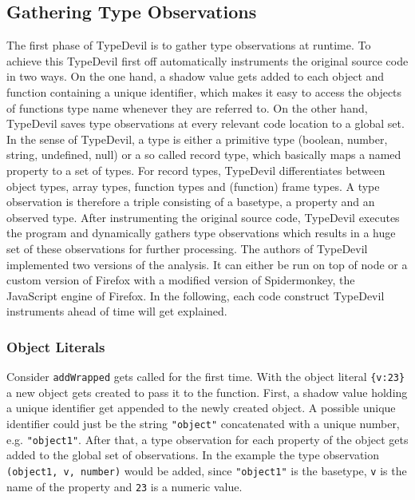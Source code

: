 \documentclass[runningheads,a4paper]{llncs}
\begin{document}
\subsection{Gathering Type Observations}

The first phase of TypeDevil is to gather type observations at runtime.
To achieve this TypeDevil first off automatically instruments the original source code in two ways.
On the one hand, a shadow value gets added to each object and function containing a unique identifier, which makes it easy to access the objects of functions type name whenever they are referred to. 
On the other hand, TypeDevil saves type observations at every relevant code location to a global set.
In the sense of TypeDevil, a type is either a primitive type (boolean, number, string, undefined, null) or a so called record type, which basically maps a named property to a set of types.
For record types, TypeDevil differentiates between object types, array types, function types and (function) frame types.
A type observation is therefore a triple consisting of a basetype, a property and an observed type.
After instrumenting the original source code, TypeDevil executes the program and dynamically gathers type observations which results in a huge set of these observations for further processing.
The authors of TypeDevil implemented two versions of the analysis. 
It can either be run on top of node or a custom version of Firefox with a modified version of Spidermonkey, the JavaScript engine of Firefox.
In the following, each code construct TypeDevil instruments ahead of time will get explained.

\subsubsection{Object Literals}
Consider \lstinline[columns=fixed]{addWrapped} gets called for the first time.
With the object literal \lstinline[columns=fixed]!{v:23}! a new object gets created to pass it to the function.
First, a shadow value holding a unique identifier get appended to the newly created object. A possible unique identifier could just be the string \lstinline[columns=fixed]{"object"} concatenated with a unique number, e.g. \lstinline[columns=fixed]{"object1"}.
After that, a type observation for each property of the object gets added to the global set of observations.
In the example the type observation \lstinline[columns=fixed]{(object1, v, number)} would be added, since \lstinline[columns=fixed]{"object1"} is the basetype, \lstinline[columns=fixed]{v} is the name of the property and \lstinline[columns=fixed]{23} is a numeric value.
\end{document}
